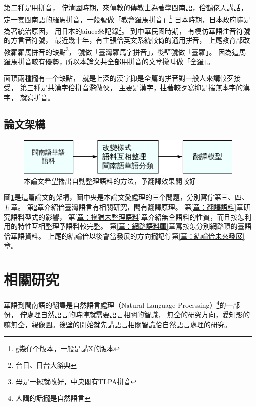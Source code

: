 \documentclass[final,oneside,onecolumn,12pt,a4paper]{book}%
\begin{document}
第二種是用拼音，
佇清國時期，來傳教的傳教士為著學閩南語，佮鶴佬人講話，
定一套閩南語的羅馬拼音，一般號做「教會羅馬拼音」\footnote{g幾仔个版本，一般是講X的版本}
日本時期，日本政府嘛是為著統治原因，
用日本的aiueo來記錄\footnote{台日、日台大辭典}。
到中華民國時期，
有模仿華語注音符號的方言音符號，
最近幾十年，有主張佮英文系統較倚的通用拼音，
上尾教育部改教羅羅馬拼音的缺點\footnote{毋是一擺就改好，中央閣有TLPA拼音}，
號做「臺灣羅馬字拼音」，後壁號做「臺羅」。
因為這馬羅馬拼音較有優勢，所以本論文共全部用拼音的文章攏叫做「全羅」。

面頂兩種攏有一个缺點，
就是上深的漢字抑是全篇的拼音對一般人來講較歹接受，
第三種是共漢字佮拼音濫做伙，
主要是漢字，拄著較歹寫抑是揣無本字的漢字，
就寫拼音。

\section{論文架構}
\label{節：論文架構}

\begin{figure}[pth]
\centerline{\includegraphics[keepaspectratio]{圖/規个論文}}
\caption{本論文希望揣出自動整理語料的方法，予翻譯效果閣較好}
\label{圖：規个論文架構}
\end{figure}
圖\ref{圖：規个論文架構}是這篇論文的架構，圖中央是本論文愛處理的三个問題，分別寫佇第三、四、五章。
第\ref{章：相關研究}章介紹佮臺灣語言有相關研究，閣有翻譯原理。
第\ref{章：翻譯語料}章研究語料型式的影響，
第\ref{章：摻猶未整理語料}章介紹無仝語料的性質，而且按怎利用的特性互相整理予語料較完整。
第\ref{章：網路語料庫}章寫按怎分別網路頂的臺語佮華語資料。
上尾的結論佮以後會當發展的方向攏記佇第\ref{章：結論佮未來發展}章。

\chapter{相關研究}
\label{章：相關研究}
華語到閩南語的翻譯是自然語言處理（Natural Language Processing）\footnote{人講的話攏是自然語言}的一部份，
佇處理自然語言的時陣就需要語言相關的智識，
無仝的研究方向，愛知影的嘛無仝，親像圖。後壁的開始就先講語言相關智識佮自然語言處理的研究。

\end{document}
